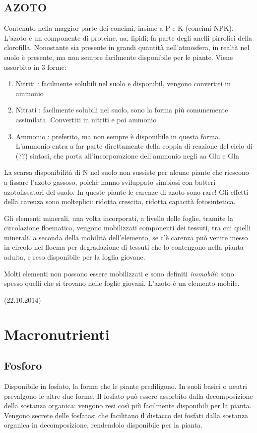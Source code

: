 \documentclass[a4paper,12pt]{book}
\begin{document}
\subsection{AZOTO}
Contenuto nella maggior parte dei concimi, insime a P e K (concimi NPK). 
L'azoto è un componente di proteine, aa, lipidi; fa parte degli anelli pirrolici della clorofilla. Nonostante sia presente in grandi quantità nell'atmosfera, in realtà nel suolo è presente, ma non sempre facilmente disponibile per le piante. Viene assorbito in 3 forme:
\begin{enumerate}
\item{Nitriti : facilmente solubili nel suolo e disponibil, vengono convertiti in ammonio}
\item{Nitrati : facilmente solubili nel suolo, sono la forma più comunemente assimilata. Convertiti in nitriti e poi ammonio}
\item{Ammonio : preferito, ma non sempre è disponibile in questa forma. L'ammonio entra a far parte direttamente della coppia di reazione del ciclo di  (??) sintasi, che porta all'incorporazione dell'ammonio negli aa Glu e Gln}
\end{enumerate}
La scarsa disponibilità di N nel suolo non sussiste per alcune piante che riescono a fissare l'azoto gassoso, poichè hanno sviluppato simbiosi con batteri azotofissatori del suolo. In queste piante le carenze di azoto sono rare!
Gli effetti della carenza sono molteplici: ridotta crescita, ridotta capacità fotosintetica.

Gli elementi minerali, una volta incorporati, a livello delle foglie, tramite la circolazione floematica, vengono mobilizzati componenti dei tessuti, tra cui quelli minerali. a seconda della mobilità dell'elemento, se c'è carenza può venire messo in circolo nel floema per degradazione di tessuti che lo contengono nella pianta adulta, e reso disponibile per la foglia giovane. 

Molti elementi non possono essere mobilizzati e sono definiti \emph{immobili}: sono spesso quelli che si trovano nelle foglie giovani.
L'azoto è un elemento mobile.

(22.10.2014) 
\section{Macronutrienti}
\subsection{Fosforo}
Disponibile in fosfato, la forma che le piante prediligono. In suoli basici o neutri prevalgono le altre due forme.
Il fosfato può essere assorbito dalla decomposizione della sostanza organica: vengono resi così più facilmente disponibili per la pianta. Vengono secrete delle fosfatasi che facilitano il distacco dei fosfati dalla sostanza organica in decomposizione, rendendolo disponibile per la pianta.
\end{document}
